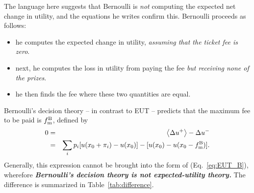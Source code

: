 \documentclass[pdftex]{article}
\newcommand{\ave}[1]{\left\langle#1 \right\rangle}
\newcommand{\bi}{\begin{itemize}}
\newcommand{\ei}{\end{itemize}}
\newcommand{\elabel}[1]{\label{eq:#1}}
\newcommand{\eref}[1]{(Eq.~\ref{eq:#1})}
\newcommand{\tref}[1]{Table~\ref{tab:#1}}
\newcommand{\bea}{\begin{eqnarray}}
\newcommand{\eea}{\end{eqnarray}}
\newcommand{\Du}{\Delta u}
\newcommand{\tmb}{{f_{\text{\normalfont{m}}}^{\text{\normalfont{B}}}}}
\begin{document}
The language here suggests that Bernoulli is {\it not} computing the expected net change in utility, and the equations he writes confirm this. Bernoulli proceeds as follows:
\bi
\item
he computes the expected change in utility, {\it assuming that the ticket fee is zero}.
\item
next, he computes the loss in utility from paying the fee {\it but receiving none of the prizes}.
\item
he then finds the fee where these two quantities are equal.  
\ei 
Bernoulli's decision theory -- in contrast to EUT -- predicts that the maximum fee to be paid is $\tmb$, defined by
\bea
0&=&\ave{\Du^+}-\Du^-\\
&=&\sum_i p_i [u(x_0+\pi_i) -u(x_0)] - [ u(x_0)-u(x_0-\tmb)].
\elabel{ub}
\eea
Generally, this expression cannot be brought into the form of \eref{EUT_B}, wherefore {\it \bf Bernoulli's decision theory is not expected-utility theory.} The difference is summarized in \tref{difference}.
\end{document}
